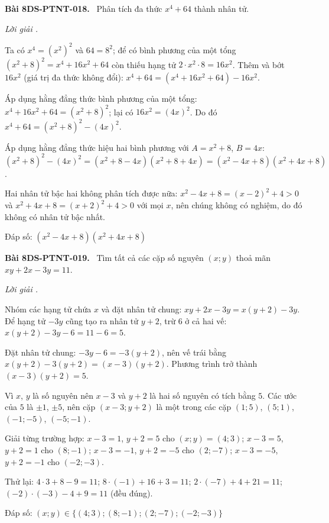 \documentclass[12pt,a4paper]{article}
\newenvironment{problem}[1][]{\par\medskip\noindent\textbf{Bài #1.}\ }{\par}
\newenvironment{solution}[1][]{\par\noindent\textit{Lời giải #1.}\par}{\par}
\begin{document}
\begin{problem}[8DS-PTNT-018]
Phân tích đa thức $x^4 + 64$ thành nhân tử.

\begin{solution}
Ta có $x^4 = (x^2)^2$ và $64 = 8^2$; để có bình phương của một tổng $(x^2 + 8)^2 = x^4 + 16x^2 + 64$ còn thiếu hạng tử $2 \cdot x^2 \cdot 8 = 16x^2$. Thêm và bớt $16x^2$ (giá trị đa thức không đổi): $x^4 + 64 = (x^4 + 16x^2 + 64) - 16x^2$.

Áp dụng hằng đẳng thức bình phương của một tổng: $x^4 + 16x^2 + 64 = (x^2 + 8)^2$; lại có $16x^2 = (4x)^2$. Do đó $x^4 + 64 = (x^2 + 8)^2 - (4x)^2$.

Áp dụng hằng đẳng thức hiệu hai bình phương với $A = x^2 + 8$, $B = 4x$: $(x^2 + 8)^2 - (4x)^2 = (x^2 + 8 - 4x)(x^2 + 8 + 4x) = (x^2 - 4x + 8)(x^2 + 4x + 8)$.

Hai nhân tử bậc hai không phân tích được nữa: $x^2 - 4x + 8 = (x - 2)^2 + 4 > 0$ và $x^2 + 4x + 8 = (x + 2)^2 + 4 > 0$ với mọi $x$, nên chúng không có nghiệm, do đó không có nhân tử bậc nhất.

Đáp số: $\boxed{(x^2 - 4x + 8)(x^2 + 4x + 8)}$
\end{solution}
\end{problem}

\begin{problem}[8DS-PTNT-019]
Tìm tất cả các cặp số nguyên $(x; y)$ thoả mãn $xy + 2x - 3y = 11$.

\begin{solution}
Nhóm các hạng tử chứa $x$ và đặt nhân tử chung: $xy + 2x - 3y = x(y + 2) - 3y$. Để hạng tử $-3y$ cũng tạo ra nhân tử $y + 2$, trừ $6$ ở cả hai vế: $x(y + 2) - 3y - 6 = 11 - 6 = 5$.

Đặt nhân tử chung: $-3y - 6 = -3(y + 2)$, nên vế trái bằng $x(y + 2) - 3(y + 2) = (x - 3)(y + 2)$. Phương trình trở thành $(x - 3)(y + 2) = 5$.

Vì $x$, $y$ là số nguyên nên $x - 3$ và $y + 2$ là hai số nguyên có tích bằng $5$. Các ước của $5$ là $\pm 1$, $\pm 5$, nên cặp $(x - 3; y + 2)$ là một trong các cặp $(1; 5)$, $(5; 1)$, $(-1; -5)$, $(-5; -1)$.

Giải từng trường hợp: $x - 3 = 1$, $y + 2 = 5$ cho $(x; y) = (4; 3)$; $x - 3 = 5$, $y + 2 = 1$ cho $(8; -1)$; $x - 3 = -1$, $y + 2 = -5$ cho $(2; -7)$; $x - 3 = -5$, $y + 2 = -1$ cho $(-2; -3)$.

Thử lại: $4 \cdot 3 + 8 - 9 = 11$; $8 \cdot (-1) + 16 + 3 = 11$; $2 \cdot (-7) + 4 + 21 = 11$; $(-2) \cdot (-3) - 4 + 9 = 11$ (đều đúng).

Đáp số: $\boxed{(x; y) \in \{(4; 3); (8; -1); (2; -7); (-2; -3)\}}$
\end{solution}
\end{problem}
\end{document}
